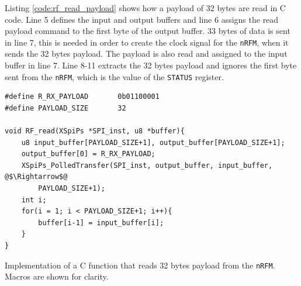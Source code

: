 Listing \ref{code:rf_read_payload} shows how a payload of 32 bytes are read in C code. 
Line 5 defines the input and output buffers and line 6 assigns the read payload command to the first byte of the output buffer.
33 bytes of data is sent in line 7, this is needed in order to create the clock signal for the \texttt{nRFM}, when it sends the 32 bytes payload.
The payload is also read and assigned to the input buffer in line 7.
Line 8-11 extracts the 32 bytes payload and ignores the first byte sent from the \texttt{nRFM}, which is the value of the \texttt{STATUS} register.

\begin{listing}[!h]
\begin{verbatim}
#define R_RX_PAYLOAD       0b01100001
#define PAYLOAD_SIZE       32

void RF_read(XSpiPs *SPI_inst, u8 *buffer){
	u8 input_buffer[PAYLOAD_SIZE+1], output_buffer[PAYLOAD_SIZE+1];
	output_buffer[0] = R_RX_PAYLOAD;
	XSpiPs_PolledTransfer(SPI_inst, output_buffer, input_buffer, @$\Rightarrow$@
		PAYLOAD_SIZE+1);
	int i;
	for(i = 1; i < PAYLOAD_SIZE+1; i++){
		buffer[i-1] = input_buffer[i];
	}
}
\end{verbatim}
\caption{Implementation of a C function that reads 32 bytes payload from the \texttt{nRFM}. Macros are shown for clarity.}
\label{code:rf_read_payload}
\end{listing}

